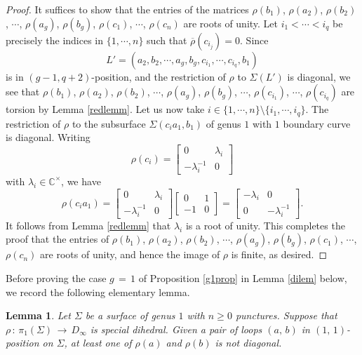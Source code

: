 \documentclass[reqno]{amsart}
\theoremstyle{plain}
\newtheorem{lemma}[theorem]{Lemma}
\theoremstyle{definition}
\theoremstyle{remark}
\newcommand{\C}{{\mathbb{C}}}
\begin{document}
\begin{proof}
It suffices to show that the entries of the matrices $\rho(b_1)$, $\rho(a_2)$, $\rho(b_2)$, $\cdots$, $\rho(a_g)$, $\rho(b_g)$, $\rho(c_1)$, $\cdots$, $\rho(c_n)$ are roots of unity. Let $i_1<\cdots<i_q$ be precisely the indices in $\{1,\cdots,n\}$ such that $\overline{\rho}(c_{i_j})=0$. Since
$$L'=(a_2,b_2,\cdots,a_g,b_g,c_{i_1},\cdots,c_{i_q},b_1)$$
is in $(g-1,q+2)$-position, and the restriction of $\rho$ to $\Sigma(L')$ is diagonal, we see that $\rho(b_1)$, $\rho(a_2)$, $\rho(b_2)$, $\cdots$, $\rho(a_g)$, $\rho(b_g)$, $\cdots$, $\rho(c_{i_1})$, $\cdots$, $\rho(c_{i_q})$ are torsion by Lemma \ref{redlemm}. Let us now take $i\in\{1,\cdots,n\}\setminus\{i_1,\cdots,i_q\}$. The restriction of $\rho$ to the subsurface $\Sigma(c_ia_1,b_1)$ of genus $1$ with $1$ boundary curve is diagonal. Writing
$$\rho(c_i)=\begin{bmatrix}0 & \lambda_i\\-\lambda_i^{-1}&0\end{bmatrix}$$
with $\lambda_i\in\C^\times$, we have
$$\rho(c_ia_1)=\begin{bmatrix}0 & \lambda_i\\ -\lambda_i^{-1} & 0\end{bmatrix}\begin{bmatrix}0 & 1\\ -1 & 0\end{bmatrix}=\begin{bmatrix}-\lambda_i&0\\ 0 & -\lambda_i^{-1}\end{bmatrix}.$$
It follows from Lemma \ref{redlemm} that $\lambda_i$ is a root of unity. This completes the proof that the entries of $\rho(b_1)$, $\rho(a_2)$, $\rho(b_2)$, $\cdots$, $\rho(a_g)$, $\rho(b_g)$, $\rho(c_1)$, $\cdots$, $\rho(c_n)$ are roots of unity, and hence the image of $\rho$ is finite, as desired.
\end{proof}

Before proving the case $g\,=\,1$ of Proposition \ref{g1prop} in Lemma \ref{dilem} below, we record the following 
elementary lemma.

\begin{lemma}
\label{intlem}
Let $\Sigma$ be a surface of genus $1$ with $n\geq0$ punctures. Suppose that $\rho\,:\,\pi_1(\Sigma)
\,\to\, D_\infty$ is special dihedral. Given a pair of loops $(a,\,b)$ in $(1,\,1)$-position on $\Sigma$, at
least one of $\rho(a)$ and $\rho(b)$ is not diagonal.
\end{lemma}
\end{document}
